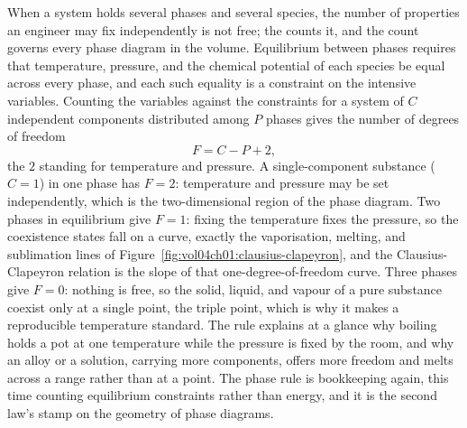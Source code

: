 \begin{mastery}
When a system holds several phases and several species, the number of properties an
engineer may fix independently is not free; the  counts it,
and the count governs every phase diagram in the volume. Equilibrium between phases
requires that temperature, pressure, and the chemical potential of each species be
equal across every phase, and each such equality is a constraint on the intensive
variables. Counting the variables against the constraints for a system of $C$
independent components distributed among $P$ phases gives the number of degrees of
freedom
\[
F = C - P + 2,
\]
the $2$ standing for temperature and pressure. A single-component substance ($C=1$)
in one phase has $F = 2$: temperature and pressure may be set independently, which
is the two-dimensional region of the phase diagram. Two phases in equilibrium give
$F = 1$: fixing the temperature fixes the pressure, so the coexistence states fall
on a curve, exactly the vaporisation, melting, and sublimation lines of
Figure~\ref{fig:vol04ch01:clausius-clapeyron}, and the Clausius-Clapeyron relation
is the slope of that one-degree-of-freedom curve. Three phases give $F = 0$: nothing
is free, so the solid, liquid, and vapour of a pure substance coexist only at a
single point, the triple point, which is why it makes a reproducible temperature
standard. The rule explains at a glance why boiling holds a pot at one temperature
while the pressure is fixed by the room, and why an alloy or a solution, carrying
more components, offers more freedom and melts across a range rather than at a point.
The phase rule is bookkeeping again, this time counting equilibrium constraints
rather than energy, and it is the second law's stamp on the geometry of phase
diagrams.
\end{mastery}


